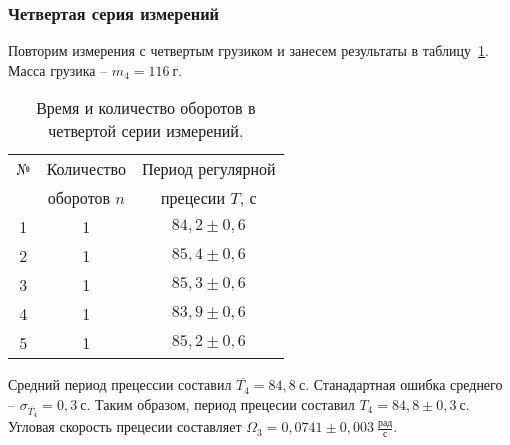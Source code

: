 \documentclass[a4paper,11pt]{article}
\begin{document}
\subsubsection{Четвертая серия измерений} %
Повторим измерения с четвертым грузиком и занесем результаты в таблицу~\ref{table:tab4}.\newline
Масса грузика -- $m_{4} = 116\ г$.
\begin{table}[h!]
\centering
\begin{tabular}{ ||c|c|c|| }
  \hline
  № & Количество & Период регулярной \\
   & оборотов $n$ & прецесии $T$, $с$ \\
  \hline
  1 & 1 & $84,2 \pm 0,6$ \\
  2 & 1 & $85,4 \pm 0,6$ \\
  3 & 1 & $85,3 \pm 0,6$ \\
  4 & 1 & $83,9 \pm 0,6$ \\
  5 & 1 & $85,2 \pm 0,6$ \\
  \hline
\end{tabular}
\caption{Время и количество оборотов в четвертой серии измерений.}
\label{table:tab4}
\end{table}\newline
Средний период прецессии составил $\overline{T_{4}} = 84,8\ с$.\newline
Станадартная ошибка среднего -- $\sigma_{\overline{T_{4}}}= 0,3\ с$.\newline
Таким образом, период прецесии составил $T_{4} = 84,8 \pm 0,3\ с$.\newline
Угловая скорость прецесии составляет $\Omega_{3} = 0,0741 \pm 0,003\ \frac{рад}{с}$.
\end{document}
